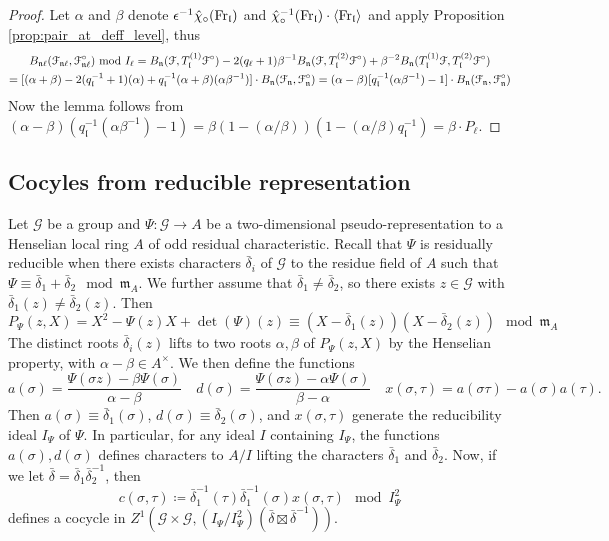 \documentclass[leqno]{amsart}
\newcommand{\euF}{\EuScript{F}} %
\newcommand{\Fr}{\textnormal{Fr}} %
\newcommand{\fm}{\mathfrak{m}}
\newcommand{\fn}{\mathfrak{n}}
\newcommand{\fl}{\mathfrak{l}}
\theoremstyle{definition}
\theoremstyle{remark}
\begin{document}
\begin{proof}
Let $\alpha$ and  $\beta$ denote 
$\epsilon^{-1}\hat{\chi}_\circ(\Fr_\fl)$ and 
$\hat{\chi}_\circ^{-1}(\Fr_\fl)\cdot
\langle \Fr_\fl\rangle$
and apply Proposition \ref{prop:pair_at_deff_level}, thus
\begin{multline*}
B_{\fn\ell}(\euF_{\fn\ell}, \euF^{\circ}_{\fn\ell})
\text{ mod }I_\ell=
B_\fn(\euF, T_\fl^{(1)}\euF^\circ)
-2(q_\ell+1)\beta^{-1}B_\fn(\euF, T_\fl^{(2)}\euF^\circ)
+\beta^{-2}B_\fn(T_\fl^{(1)}\euF, T_\fl^{(2)}\euF^\circ)
\\=
[(\alpha+\beta)-2(q_\fl^{-1}+1)(\alpha)
+q_\fl^{-1}(\alpha+\beta)(\alpha\beta^{-1})]\cdot 
B_\fn(\euF_{\fn}, \euF^\circ_\fn)=
(\alpha-\beta)[q_\fl^{-1}(\alpha\beta^{-1})-1]\cdot 
B_\fn(\euF_{\fn}, \euF^\circ_\fn)
\end{multline*}
Now the lemma follows from
$(\alpha-\beta)(q_\fl^{-1}(\alpha\beta^{-1})-1)
=\beta(1-(\alpha/\beta))(1-(\alpha/\beta)q_\fl^{-1})
=\beta\cdot P_\ell$.
\end{proof}

\subsection{Cocyles from reducible representation}

Let $\mathcal{G}$ be a group and 
$\Psi\colon \mathcal{G}\to A$
be a two-dimensional pseudo-representation
to a Henselian local ring $A$
of odd residual characteristic.
Recall that 
$\Psi$ is residually reducible
when there exists characters
$ \bar{\delta}_i$ of $\mathcal{G}$
to the residue field of  $A$
such that  
$\Psi\equiv \bar{\delta}_1+\bar{\delta}_2\mod \fm_A$.
We further assume that $\bar{\delta}_1\neq \bar{\delta}_2$,
so there exists $z\in \mathcal{G}$
with  $\bar{\delta}_1(z)\neq \bar{\delta}_2(z)$.
Then
\begin{equation}
    P_\Psi(z,X)=
    X^2-\Psi(z)X+\det(\Psi)(z) \equiv 
    (X-\bar{\delta}_1(z))(X-\bar{\delta}_2(z))
    \mod \fm_A
\end{equation}
The distinct roots $\bar{\delta}_i(z)$
lifts to two roots $\alpha,\beta$ of  $P_\Psi(z,X)$
by the Henselian property,
with $\alpha-\beta\in A^\times$.
We then define the functions
\begin{equation}
   a(\sigma)=
   \frac{\Psi(\sigma z)-\beta\Psi(\sigma)}{\alpha-\beta}\quad
   d(\sigma)=
   \frac{\Psi(\sigma z)-\alpha\Psi(\sigma)}{\beta-\alpha}\quad
   x(\sigma,\tau)=a(\sigma\tau)-a(\sigma)a(\tau).
\end{equation}
Then 
$a(\sigma)\equiv \bar{\delta}_1(\sigma)$,
$d(\sigma)\equiv \bar{\delta}_2(\sigma)$,
and $x(\sigma,\tau)$
generate the reducibility ideal
$I_\Psi$ of  $\Psi$.
In particular,
for any ideal $I$ containing $I_\Psi$,
the functions $a(\sigma),d(\sigma)$
defines characters to  $A/I$
lifting the characters
$\bar{\delta}_1$ and $\bar{\delta}_2$.
Now, if we let
$\bar{\delta}=\bar{\delta}_1\bar{\delta}_2^{-1}$, then
\begin{equation*}
    c(\sigma,\tau)\coloneqq \bar{\delta}_1^{-1}(\tau)
    \bar{\delta}_1^{-1}(\sigma)x(\sigma, \tau)\mod I_\Psi^2
\end{equation*}
defines a cocycle in 
$Z^1(\mathcal{G}\times \mathcal{G}, 
(I_\Psi/I_\Psi^2)(\bar{\delta}\boxtimes \bar{\delta}^{-1}))$.
\end{document}
